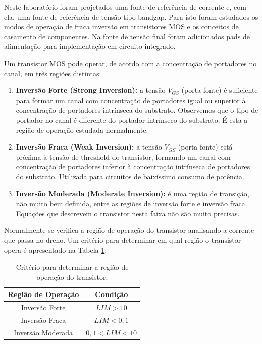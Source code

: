 ﻿\documentclass[12pt,a4paper]{article}
\begin{document}
Neste laboratório foram projetados uma fonte de referência de corrente e, com ela, uma fonte de referência de tensão tipo bandgap. Para isto foram estudados os modos de operação de fraca inversão em transistores MOS e os conceitos de casamento de componentes. Na fonte de tensão final foram adicionados pads de alimentação para implementação em circuito integrado.

Um transistor MOS pode operar, de acordo com a concentração de portadores no canal, em três regiões distintas:

\begin{enumerate}
    \item \textbf{Inversão Forte (Strong Inversion):} a tensão $V_{GS}$ (porta-fonte) é suficiente para formar um canal com concentração de portadores igual ou superior à concentração de portadores intrínseca do substrato. Observemos que o tipo de portador no canal é diferente do portador intrínseco do substrato. É esta a região de operação estudada normalmente.

    \item \textbf{Inversão Fraca (Weak Inversion):} a tensão $V_{GS}$ (porta-fonte) está próxima à tensão de threshold do transistor, formando um canal com concentração de portadores inferior à concentração intrínseca de portadores do substrato. Utilizada para circuitos de baixíssimo consumo de potência.

    \item \textbf{Inversão Moderada (Moderate Inversion):} é uma região de transição, não muito bem definida, entre as regiões de inversão forte e inversão fraca. Equações que descrevem o transistor nesta faixa não são muito precisas.
\end{enumerate}

Normalmente se verifica a região de operação do transistor analisando a corrente que passa no dreno. Um critério para determinar em qual região o transistor opera é apresentado na Tabela \ref{tab:operacao}.

\begin{table}[H]
\centering
\caption{Critério para determinar a região de operação do transistor.}
\label{tab:operacao}
\begin{tabular}{cc}
\toprule
\textbf{Região de Operação} & \textbf{Condição} \\
\midrule
Inversão Forte & $LIM > 10$ \\
Inversão Fraca & $LIM < 0,1$ \\
Inversão Moderada & $0,1 < LIM < 10$ \\
\bottomrule
\end{tabular}
\end{table}
\end{document}
